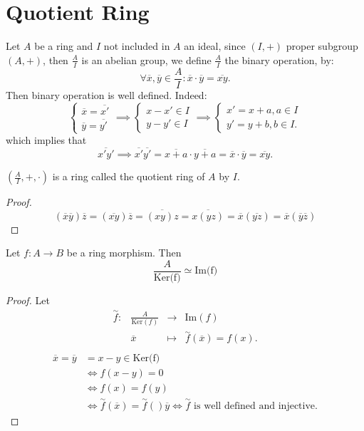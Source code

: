 \section{Quotient Ring}
Let $A$ be a ring and $I$ not included in $A$ 
an ideal, since $(I , +) $ proper subgroup $ (A, +) $, then 
$\frac{A}{I}$ is an abelian group, 
we define $\frac{A}{I}$ the binary operation, by:
\[
\forall \overline{x}, \overline{y}\in  
\frac{A}{I}: \overline{x} \cdot \overline{y} = 
\overline{xy}.
\]
Then binary operation is well defined. Indeed:
\[
\begin{cases}
\overline{x} = \overline{x'} \\
\overline{y} = \overline{y'}
\end{cases}
 \implies 
 \begin{cases}
 x - x' \in  I \\
 y - y' \in  I
 \end{cases}
 \implies 
 \begin{cases}
 x' = x + a, a \in  I \\
 y' = y + b, b \in  I.
 \end{cases}
\]
which implies that
\[
\overline{x'y'} \implies 
\overline{x'} \overline{y'} = 
\overline{x + a} \cdot \overline{y + a }= 
\overline{x}\cdot \overline{y} = \overline{xy}.
\]
\begin{proposition}[]
$(\frac{A}{I}, +, \cdot ) $ is a ring called the quotient ring of $A$ by $I$.
\end{proposition}
\begin{proof}
\[
  (\overline{x} \overline{y})  \overline{z} = 
  (\overline{xy}) \overline{z} = 
  \overline{(xy) z} = 
  \overline{x(yz) } = 
  \overline{x}(\overline{yz}) = \overline{x}
  (\overline{y} \overline{z}) 
\]
\end{proof}
\begin{theorem}
Let $ f : A \longrightarrow B $ be a ring morphism. Then
\[
\frac{A}{\text{Ker(f)}  } \simeq \text{Im(f)}  
\]
\end{theorem}
\begin{proof}
  Let 
  \[
  \begin{array}{cccc}
        \overset{\sim}{f}  : &  \frac{A}{\text{Ker}(f)  }  & \longrightarrow & \text{Im}  (f)  \\
  
             &  \overline{x}  & \longmapsto     & \overset{\sim}{f}(\overline{x})  = f(x) . \\ 
  \end{array}
  \]
  \begin{align*}
    \overline{x} =\overline{y} &= 
    x - y \in  \text{Ker(f)}   \\
                               & \iff f(x - y) = 0 
                               \\
                               & \iff  f(x)  = f(y)  \\
                               & \iff \overset{\sim}{f} (\overline{x}) = 
                               \overset{\sim}{f} ()\overline{y}  
                               \iff  \overset{\sim}{f}  \text{ is well defined and injective.}  
  \end{align*}
\end{proof}
